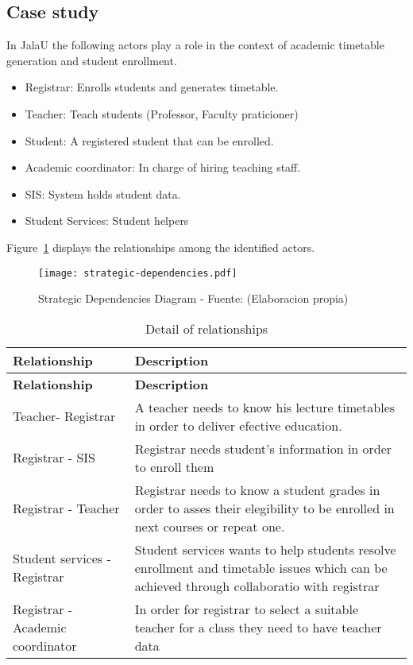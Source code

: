 \subsection{Case study}
In JalaU the following actors play a role in the context of academic timetable generation and student enrollment.
\begin{itemize}
	\item Registrar: Enrolls students and generates timetable.
	\item Teacher: Teach students (Professor, Faculty praticioner)
	\item Student: A registered student that can be enrolled.
	\item Academic coordinator: In charge of hiring teaching staff.
	\item SIS: System holds student data.
	\item Student Services: Student helpers
\end{itemize}

Figure~\ref{fig:strategicDependenciesDiagram} displays the relationships among the identified actors.

\begin{figure}[htb]
	\caption{Strategic Dependencies Diagram - Fuente: (Elaboracion propia)}\label{fig:strategicDependenciesDiagram}
	\begin{center}
		\texttt{[image: strategic-dependencies.pdf]}
	\end{center}
\end{figure}

\begin{longtable}{p{3in}|p{3in}}
\caption{Detail of relationships} \label{tab:strategicDependencies} \\

\textbf{Relationship} &  \textbf{Description}\\
\hline
\endfirsthead
\textbf{Relationship} & \textbf{Description}\\
\hline
\endhead
\endfoot

Teacher- Registrar & A teacher needs to know his lecture timetables in order to deliver efective education. \\
Registrar - SIS & Registrar needs student's information in order to enroll them\\
Registrar - Teacher & Registrar needs to know a student grades in order to asses their elegibility to be enrolled in next courses or repeat one. \\
Student services - Registrar & Student services wants to help students resolve enrollment and timetable issues which can be achieved through collaboratio with registrar \\
Registrar - Academic coordinator & In order for registrar to select a suitable teacher for a class they need to have teacher data\\

\end{longtable}

